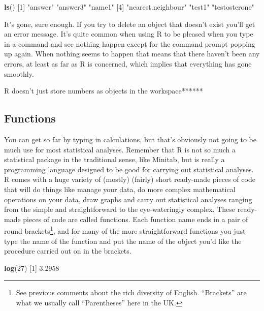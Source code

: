 \documentclass[
]{book}
\newenvironment{Shaded}{\begin{snugshade}}{\end{snugshade}}
\newcommand{\DecValTok}[1]{\textcolor[rgb]{0.00,0.00,0.81}{#1}}
\newcommand{\FloatTok}[1]{\textcolor[rgb]{0.00,0.00,0.81}{#1}}
\newcommand{\KeywordTok}[1]{\textcolor[rgb]{0.13,0.29,0.53}{\textbf{#1}}}
\newcommand{\NormalTok}[1]{#1}
\newcommand{\StringTok}[1]{\textcolor[rgb]{0.31,0.60,0.02}{#1}}
\begin{document}
\begin{Shaded}
\begin{Highlighting}[]
\KeywordTok{ls}\NormalTok{()}
\NormalTok{[}\DecValTok{1}\NormalTok{] }\StringTok{"answer"}            \StringTok{"answer3"}           \StringTok{"name1"}            
\NormalTok{[}\DecValTok{4}\NormalTok{] }\StringTok{"nearest.neighbour"} \StringTok{"test1"}             \StringTok{"testosterone"}     
\end{Highlighting}
\end{Shaded}

It's gone, sure enough. If you try to delete an object that doesn't exist you'll get an error message. It's quite common when using R to be pleased when you type in a command and see nothing happen except for the command prompt popping up again. When nothing seems to happen that means that there haven't been any errors, at least as far as R is concerned, which implies that everything has gone smoothly.

R doesn't just store numbers as objects in the workspace******

\hypertarget{functions}{%
\subsection{Functions}\label{functions}}

You can get so far by typing in calculations, but that's obviously not going to be much use for most statistical analyses. Remember that R is not so much a statistical package in the traditional sense, like Minitab, but is really a programming language designed to be good for carrying out statistical analyses. R comes with a huge variety of (mostly) (fairly) short ready-made pieces of code that will do things like manage your data, do more complex mathematical operations on your data, draw graphs and carry out statistical analyses ranging from the simple and straightforward to the eye-wateringly complex. These ready-made pieces of code are called functions. Each function name ends in a pair of round brackets\footnote{See previous comments about the rich diversity of English. ``Brackets'' are what we usually call ``Parentheses'' here in the UK.}, and for many of the more straightforward functions you just type the name of the function and put the name of the object you'd like the procedure carried out on in the brackets.

\begin{Shaded}
\begin{Highlighting}[]
\KeywordTok{log}\NormalTok{(}\DecValTok{27}\NormalTok{)}
\NormalTok{[}\DecValTok{1}\NormalTok{] }\FloatTok{3.2958}
\end{Highlighting}
\end{Shaded}
\end{document}
